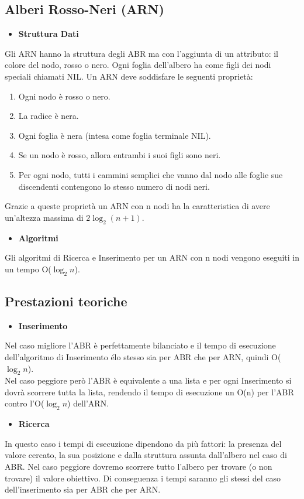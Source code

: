 \documentclass{article}
\begin{document}
\subsection{Alberi Rosso-Neri (ARN)}
\begin{itemize}
    \item \textbf{Struttura Dati}
\end{itemize}
Gli ARN hanno la struttura degli ABR ma con l'aggiunta di un attributo: il colore del nodo, rosso o nero. Ogni foglia dell'albero ha come figli dei nodi speciali chiamati NIL. Un ARN deve soddisfare le seguenti proprietà:
\begin{enumerate}
    \item Ogni nodo è rosso o nero.
    \item La radice è nera.
    \item Ogni foglia è nera (intesa come foglia terminale NIL).
    \item Se un nodo è rosso, allora entrambi i suoi figli sono neri.
    \item Per ogni nodo, tutti i cammini semplici che vanno dal nodo alle foglie sue discendenti contengono lo stesso numero di nodi neri.
\end{enumerate}
Grazie a queste proprietà un ARN con n nodi ha la caratteristica di avere un'altezza massima di $2{\log_{2}{(n+1)}}$.
\begin{itemize}
    \item \textbf{Algoritmi}
\end{itemize}
Gli algoritmi di Ricerca e Inserimento per un ARN con n nodi vengono eseguiti in un tempo O(${\log_{2}{n}}$).

\subsection{Prestazioni teoriche}
\begin{itemize}
    \item \textbf{Inserimento}
\end{itemize}
Nel caso migliore l'ABR è perfettamente bilanciato e il tempo di esecuzione dell'algoritmo di Inserimento élo stesso sia per ABR che per ARN, quindi O(${\log_{2}{n}}$). \\
Nel caso peggiore però l'ABR è equivalente a una lista e per ogni Inserimento si dovrà scorrere tutta la lista, rendendo il tempo di esecuzione un O(n) per l'ABR contro l'O(${\log_{2}{n}}$)  dell'ARN.

\begin{itemize}
    \item \textbf{Ricerca}
\end{itemize}
In questo caso i tempi di esecuzione dipendono da più fattori: la presenza del valore cercato, la sua posizione e dalla struttura assunta dall'albero nel caso di ABR. Nel caso peggiore dovremo scorrere tutto l'albero per trovare (o non trovare) il valore obiettivo. Di conseguenza i tempi saranno gli stessi del caso dell'inserimento sia per ABR che per ARN.
\end{document}
